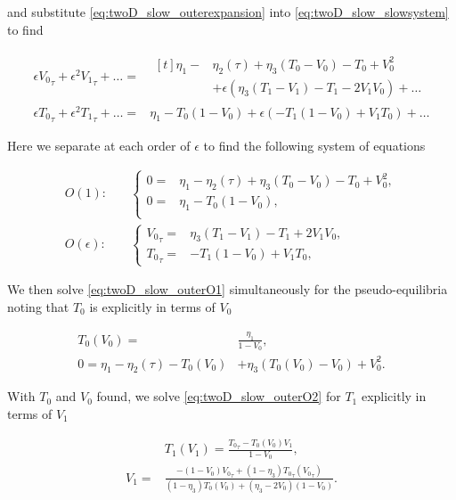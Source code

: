and substitute \eqref{eq:twoD_slow_outerexpansion} into \eqref{eq:twoD_slow_slowsystem} to find

\begin{equation*}
\begin{aligned}
 \epsilon{V_0}_\tau+\epsilon^2{V_1}_\tau+\ldots =&\begin{aligned}[t]
\eta_1-&\eta_2(\tau)+\eta_3(T_0-V_0)-T_0+V_0^2\\
&+\epsilon(\eta_3(T_1-V_1)-T_1-2V_1V_0)+\ldots
\end{aligned}\\
\epsilon{T_0}_\tau+\epsilon^2{T_1}_\tau+\ldots=&\eta_1-T_0(1-V_0)+\epsilon(-T_1(1-V_0)+V_1T_0)+\ldots
\end{aligned}
\end{equation*}

Here we separate at each order of $\epsilon$ to find the following system of equations

\begin{align}
\label{eq:twoD_slow_outerO1}
O(1):\quad & \begin{cases}
	0 =& \eta_1-\eta_2(\tau)+\eta_3(T_0-V_0)-T_0+V_0^2 , \\
	0 =& \eta_1-T_0(1-V_0),\\
\end{cases}\\
\label{eq:twoD_slow_outerO2}
O(\epsilon):\quad & \begin{cases}
	{V_0}_\tau = & \eta_3(T_1-V_1)-T_1+2V_1V_0,\\
	{T_0}_\tau =& -T_1(1-V_0)+V_1T_0,
\end{cases}
\end{align}

We then solve \eqref{eq:twoD_slow_outerO1} simultaneously for the pseudo-equilibria noting that $T_0$ is explicitly in terms of $V_0$ 

\begin{equation}\label{eq:twoD_slow_equilibria}
\begin{aligned}
T_0(V_0)=&\frac{\eta_1}{1-V_0},\\
0=\eta_1-\eta_2(\tau)-T_0(V_0)&+\eta_3(T_0(V_0)-V_0)+V_0^2.
\end{aligned}
\end{equation}

With $T_0$ and $V_0$ found, we solve \eqref{eq:twoD_slow_outerO2} for $T_1$ explicitly in terms of $V_1$ 

\begin{equation}\label{eq:twoD_slow_equilcorrec}
\begin{aligned}
&T_1(V_1) = \frac{{T_0}_\tau-T_0(V_0)V_1}{1-V_0},\\
V_1 =& \frac{-(1-V_0){V_0}_\tau+(1-\eta_3){T_0}_\tau({V_0}_\tau)}{(1-\eta_3)T_0(V_0)+(\eta_3-2V_0)(1-V_0)}.
\end{aligned}
\end{equation}

